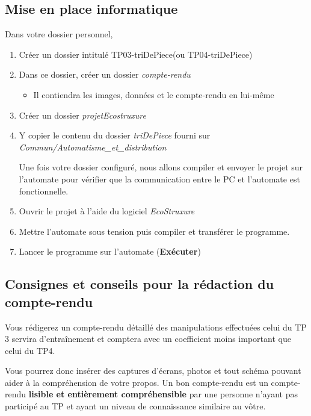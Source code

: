 \documentclass[11pt, multicol]{article}
\newcommand{\nomTP}{triDePiece}
\begin{document}
\subsection{Mise en place informatique}
\begin{UPSTIactivite}
	Dans votre dossier personnel,
	\begin{enumerate}
		\item Créer un dossier intitulé TP03-\nomTP (ou TP04-\nomTP)
		\item Dans ce dossier, créer un dossier \textit{compte-rendu}
		\begin{itemize}
			\item Il contiendra les images, données et le compte-rendu en lui-même
		\end{itemize}
		\item Créer un dossier \textit{projetEcostruxure}
		\item Y copier le contenu du dossier \textit{\nomTP} fourni sur \textit{Commun/Automatisme\_et\_distribution}

	Une fois votre dossier configuré, nous allons compiler et envoyer le projet sur l'automate pour vérifier que la communication entre le PC et l'automate est fonctionnelle.

		\item Ouvrir le projet à l'aide du logiciel \textit{EcoStruxure}
		\item Mettre l'automate sous tension puis compiler et transférer le programme.
		\item Lancer le programme sur l'automate (\textbf{Exécuter})
	\end{enumerate}
\end{UPSTIactivite}
\subsection{Consignes et conseils pour la rédaction du compte-rendu}
Vous rédigerez un compte-rendu détaillé des manipulations effectuées celui du TP 3 servira d'entraînement et comptera avec un coefficient moins important que celui du TP4.


Vous pourrez donc insérer des captures d'écrans, photos et tout schéma pouvant aider à la compréhension de votre propos.
Un bon compte-rendu est un compte-rendu \textbf{lisible et entièrement compréhensible} par une personne n'ayant pas participé au TP et ayant un niveau de connaissance similaire au vôtre.
\end{document}
